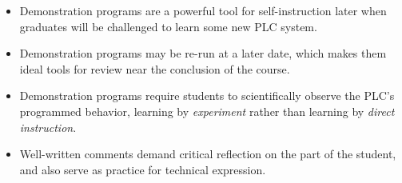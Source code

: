 \begin{itemize}
\item{} Demonstration programs are a powerful tool for self-instruction later when graduates will be challenged to learn some new PLC system.
\vskip 5pt
\item{} Demonstration programs may be re-run at a later date, which makes them ideal tools for review near the conclusion of the course.
\vskip 5pt
\item{} Demonstration programs require students to scientifically observe the PLC's programmed behavior, learning by {\it experiment} rather than learning by {\it direct instruction}.
\vskip 5pt
\item{} Well-written comments demand critical reflection on the part of the student, and also serve as practice for technical expression.
\end{itemize}




